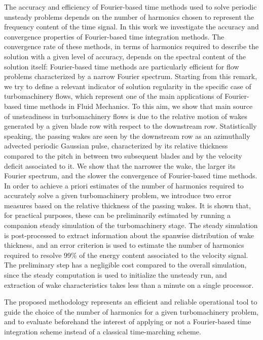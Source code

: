 The accuracy and efficiency of Fourier-based time methods 
used to solve periodic unsteady problems depends on the number of harmonics
chosen to represent the frequency content of the time signal.
In this work we investigate the accuracy and convergence properties 
of Fourier-based time integration methods. The convergence rate 
of these methods, in terms of harmonics required to describe the solution 
with a given level of accuracy, depends on the spectral content of the 
solution itself: Fourier-based time methods are particularly efficient 
for flow problems characterized by a narrow Fourier 
spectrum. Starting from this remark, we try to define a relevant 
indicator of solution regularity in the specific case of turbomachinery 
flows, which represent one of the main applications of Fourier-based 
time methods in Fluid Mechanics.
To this aim, we show that main source of unsteadiness in 
turbomachinery flows is due to the relative motion of wakes 
generated by a given blade row with respect to the downstream row. 
Statistically speaking, the passing wakes are seen by the downstream 
row as an azimuthally advected periodic Gaussian pulse, 
characterized by its relative thickness compared to the pitch 
in between two subsequent blades and by the velocity deficit 
associated to it. We show that the narrower the wake, the larger 
its Fourier spectrum, and the slower the convergence of Fourier-based time methods.
In order to achieve a priori estimates of the number of 
harmonics required to accurately solve a given turbomachinery 
problem, we introduce two error measures based on the relative 
thickness of the passing wakes. It is shown that, for practical 
purposes, these can be preliminarily estimated by running a 
companion steady simulation of the turbomachinery stage. The 
steady simulation is post-processed to extract information about 
the spanwise distribution of wake thickness, and an error criterion 
is used to estimate the number of harmonics required to resolve 99\% 
of the energy content associated to the velocity signal. The 
preliminary step has a negligible cost compared to the overall 
simulation, since the steady computation is used to initialize 
the unsteady run, and extraction of wake characteristics takes 
less than a minute on a single processor. 

The proposed methodology represents an efficient and reliable 
operational tool to guide the choice of the number of harmonics 
for a given turbomachinery problem, and to evaluate beforehand the 
interest of applying or not a Fourier-based time integration scheme 
instead of a classical time-marching scheme.


